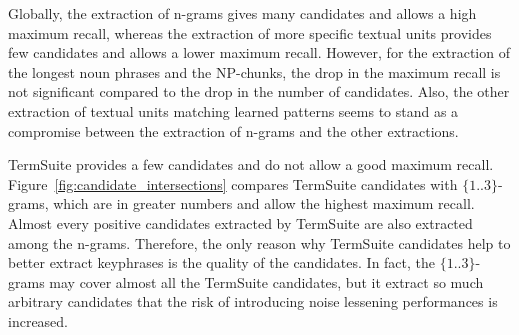       Globally, the extraction  of n-grams gives many candidates and allows a
      high maximum recall, whereas the extraction of more specific textual units
      provides few candidates and allows a lower maximum recall. However, for
      the extraction of the longest noun phrases and the NP-chunks, the drop in
      the maximum recall is not significant compared to the drop in the number
      of candidates. Also, the other extraction of textual units matching
      learned patterns seems to stand as a compromise between the extraction of
      n-grams and the other extractions.

      TermSuite provides a few candidates and do not allow a good maximum
      recall. Figure~\ref{fig:candidate_intersections} compares TermSuite
      candidates with $\{1..3\}$-grams, which are in greater numbers and allow
      the highest maximum recall. Almost every positive candidates extracted by
      TermSuite are also extracted among the n-grams. Therefore, the only reason
      why TermSuite candidates help to better extract keyphrases is the quality
      of the candidates. In fact, the $\{1..3\}$-grams may cover almost all the
      TermSuite candidates, but it extract so much arbitrary candidates that the
      risk of introducing noise lessening performances is increased.
